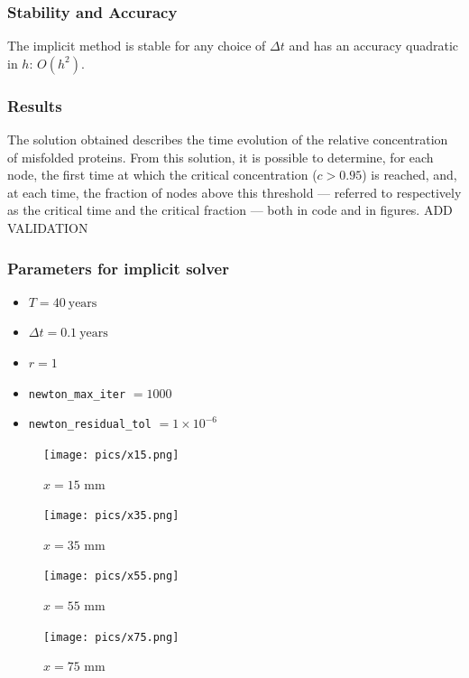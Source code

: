 \documentclass[12pt, letterpaper]{article}
\begin{document}
\subsubsection{Stability and Accuracy}
The implicit method is stable for any choice of $\Delta t$ and has an accuracy quadratic in $h$: $O(h^2)$.

\subsubsection{Results}
The solution obtained describes the time evolution of the relative concentration of misfolded proteins. From this solution, it is possible to determine, for each node, the first time at which the critical concentration ($c > 0.95$) is reached, and, at each time, the fraction of nodes above this threshold — referred to respectively as the critical time and the critical fraction — both in code and in figures.
ADD VALIDATION

\subsubsection*{Parameters for implicit solver}

\begin{itemize}
    \item $T = 40 \ \text{years}$
    \item $\Delta t = 0.1 \ \text{years}$
    \item $r = 1$
    \item \texttt{newton\_max\_iter} $= 1000$
    \item \texttt{newton\_residual\_tol} $= 1\times 10^{-6}$
\end{itemize}


\begin{figure}[H]
    \centering
    \begin{minipage}{0.4\textwidth}
        \centering
        \texttt{[image: pics/x15.png]}
        \caption{$x=15$ mm}
    \end{minipage}
    \hfill
    \begin{minipage}{0.4\textwidth}
        \centering
        \texttt{[image: pics/x35.png]}
        \caption{$x=35$ mm}
    \end{minipage}
    
    \vspace{0.5cm} %
    
    \begin{minipage}{0.4\textwidth}
        \centering
        \texttt{[image: pics/x55.png]}
        \caption{$x=55$ mm}
    \end{minipage}
    \hfill
    \begin{minipage}{0.4\textwidth}
        \centering
        \texttt{[image: pics/x75.png]}
        \caption{$x=75$ mm}
    \end{minipage}

\end{figure}
\end{document}
